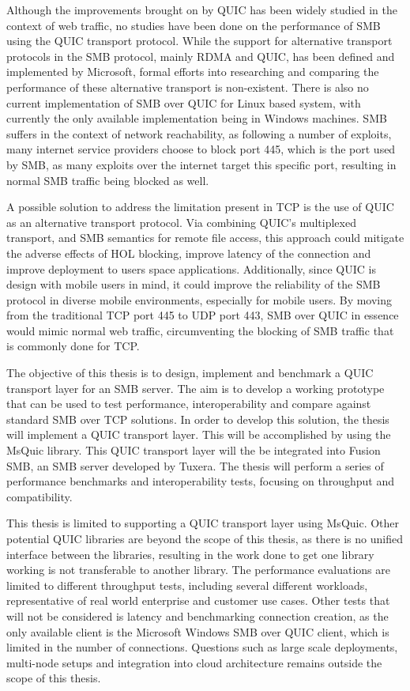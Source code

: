 \documentclass[english, 12pt, a4paper, elec, utf8, a-2b, online]{aaltothesis}
\begin{document}
Although the improvements brought on by QUIC has been widely studied in the context
of web traffic\cite{quic_better_for_what,evaluating_quic_perf,quic_and_tcp_performance},
no studies have been done on the performance of SMB using the QUIC transport protocol.
While the support for alternative transport protocols in the SMB protocol, mainly
RDMA and QUIC, has been defined and implemented by Microsoft\cite{smb2}, formal
efforts into researching and comparing the performance of these alternative transport
is non-existent. There is also no current implementation of SMB over QUIC for Linux
based system, with currently the only available implementation being in Windows machines.
SMB suffers in the context of network reachability, as following a number of exploits,
many internet service providers choose to block port 445, which is the port used
by SMB, as many exploits over the internet target this specific port, resulting
in normal SMB traffic being blocked as well\cite{bitag_port_blocking}.

A possible solution to address the limitation present in TCP is the use of
QUIC as an alternative transport protocol. Via combining QUIC's multiplexed transport,
and SMB semantics for remote file access, this approach could mitigate the adverse effects of
HOL blocking, improve latency of the connection and improve deployment to users space
applications. Additionally, since QUIC is design with mobile users in mind, it could
improve the reliability of the SMB protocol in diverse mobile environments, especially
for mobile users. By moving from the traditional TCP port 445 to UDP port 443,
SMB over QUIC in essence would mimic normal web traffic, circumventing the blocking
of SMB traffic that is commonly done for TCP.

The objective of this thesis is to design, implement and benchmark a QUIC transport
layer for an SMB server. The aim is to develop a working prototype that can be used to
test performance, interoperability and compare against standard SMB over TCP solutions.
In order to develop this solution, the thesis will implement a QUIC transport layer. This
will be accomplished by using the MsQuic library\cite{msquic}. This QUIC transport layer
will the be integrated into Fusion SMB, an SMB server developed by Tuxera\cite{fusion}.
The thesis will perform a series of performance benchmarks and interoperability tests,
focusing on throughput and compatibility.

This thesis is limited to supporting a QUIC transport layer using MsQuic. Other
potential QUIC libraries are beyond the scope of this thesis, as there is no
unified interface between the libraries, resulting in the work done to get one
library working is not transferable to another library. The performance evaluations
are limited to different throughput tests, including several different workloads, representative of
real world enterprise and customer use cases.
Other tests that will not be considered is latency and benchmarking connection creation,
as the only available client is the Microsoft Windows SMB over QUIC client, which is
limited in the number of connections. Questions such as large scale deployments,
multi-node setups and integration into cloud architecture remains outside the scope
of this thesis.
\end{document}

